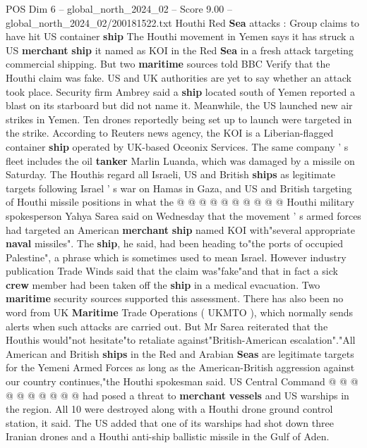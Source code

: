 \begin{textsample}{POS Dim 6 – global\_north\_2024\_02 – Score 9.00 – global\_north\_2024\_02/200181522.txt}  \label{ex:f6_pos_173}
Houthi Red \textbf{Sea} attacks : Group claims to have hit US container \textbf{ship} The Houthi movement in Yemen says it has struck a US \textbf{merchant} \textbf{ship} it named as KOI in the Red \textbf{Sea} in a fresh attack targeting commercial shipping.
But two \textbf{maritime} sources told BBC Verify that the Houthi claim was fake.
US and UK authorities are yet to say whether an attack took place.
Security firm Ambrey said a \textbf{ship} located south of Yemen reported a blast on its starboard but did not name it.
Meanwhile, the US launched new air strikes in Yemen.
Ten drones reportedly being set up to launch were targeted in the strike.
According to Reuters news agency, the KOI is a Liberian-flagged container \textbf{ship} operated by UK-based Oceonix Services.
The same company ' s fleet includes the oil \textbf{tanker} Marlin Luanda, which was damaged by a missile on Saturday.
The Houthis regard all Israeli, US and British \textbf{ships} as legitimate targets following Israel ' s war on Hamas in Gaza, and US and British targeting of Houthi missile positions in what the @ @ @ @ @ @ @ @ @ @ Houthi military spokesperson Yahya Sarea said on Wednesday that the movement ' s armed forces had targeted an American \textbf{merchant} \textbf{ship} named KOI with"several appropriate \textbf{naval} missiles".
The \textbf{ship}, he said, had been heading to"the ports of occupied Palestine", a phrase which is sometimes used to mean Israel.
However industry publication Trade Winds said that the claim was"fake"and that in fact a sick \textbf{crew} member had been taken off the \textbf{ship} in a medical evacuation.
Two \textbf{maritime} security sources supported this assessment.
There has also been no word from UK \textbf{Maritime} Trade Operations ( UKMTO ), which normally sends alerts when such attacks are carried out.
But Mr Sarea reiterated that the Houthis would"not hesitate"to retaliate against"British-American escalation"."All American and British \textbf{ships} in the Red and Arabian \textbf{Seas} are legitimate targets for the Yemeni Armed Forces as long as the American-British aggression against our country continues,"the Houthi spokesman said.
US Central Command @ @ @ @ @ @ @ @ @ @ had posed a threat to \textbf{merchant} \textbf{vessels} and US warships in the region.
All 10 were destroyed along with a Houthi drone ground control station, it said.
The US added that one of its warships had shot down three Iranian drones and a Houthi anti-ship ballistic missile in the Gulf of Aden.

\end{textsample}

